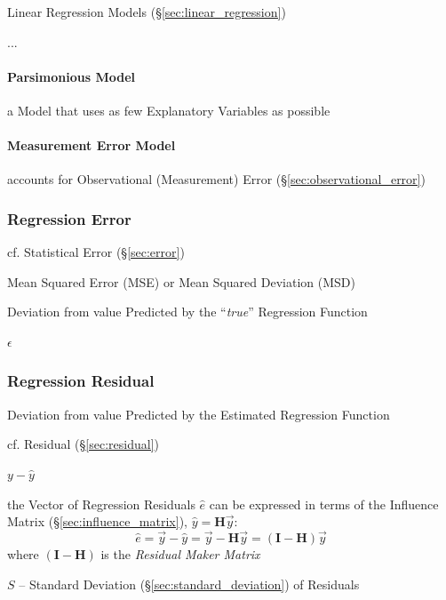 Linear Regression Models (\S\ref{sec:linear_regression})

...



\paragraph{Parsimonious Model}\label{sec:parsimony}\hfill

a Model that uses as few Explanatory Variables as possible



\paragraph{Measurement Error Model}\label{sec:measurement_error_model}\hfill

accounts for Observational (Measurement) Error (\S\ref{sec:observational_error})



\subsubsection{Regression Error}\label{sec:regression_error}

\fist cf. Statistical Error (\S\ref{sec:error})

Mean Squared Error (MSE) or Mean Squared Deviation (MSD)

Deviation from value Predicted by the ``\emph{true}'' Regression Function

$\epsilon$



\subsubsection{Regression Residual}\label{sec:regression_residual}

Deviation from value Predicted by the Estimated Regression Function

\fist cf. Residual (\S\ref{sec:residual})

$y - \hat{y}$

the Vector of Regression Residuals $\hat{e}$ can be expressed in terms of the
Influence Matrix (\S\ref{sec:influence_matrix}), $\hat{y} = \mathbf{H}\vec{y}$:
\[
  \hat{e} = \vec{y} - \hat{y} = \vec{y} - \mathbf{H}\vec{y} =
    (\mathbf{I} - \mathbf{H})\vec{y}
\]
where $(\mathbf{I} - \mathbf{H})$ is the \emph{Residual Maker Matrix}

$S$ -- Standard Deviation (\S\ref{sec:standard_deviation}) of Residuals

